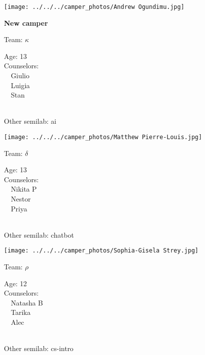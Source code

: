 \documentclass[10pt,letterpaper, landscape]{article}
\begin{document}
\horizontalshiftfornextsticker
\renewcommand{\baselinestretch}{1} \begin{sticker}
\noindent\begin{minipage}{0.5\textwidth}\texttt{[image: ../../../camper\_photos/Andrew Ogundimu.jpg]}\end{minipage}\begin{minipage}{0.45\textwidth}
\textbf{New camper} 

Team: {\Large $\kappa$}

Age:        13\\
Counselors: \\\ \ Giulio\\\ \ Luigia\\\ \ Stan\\
\end{minipage} \\ \vspace{0.07in}
Other semilab: ai
\end{sticker}
\verticalshiftfornextsticker
\renewcommand{\baselinestretch}{1} \begin{sticker}
\noindent\begin{minipage}{0.5\textwidth}\texttt{[image: ../../../camper\_photos/Matthew Pierre-Louis.jpg]}\end{minipage}\begin{minipage}{0.45\textwidth}
Team: {\Large $\delta$}

Age:        13\\
Counselors: \\\ \ Nikita P\\\ \ Nestor\\\ \ Priya\\
\end{minipage} \\ \vspace{0.07in}
Other semilab: chatbot
\end{sticker}
\horizontalshiftfornextsticker
\renewcommand{\baselinestretch}{1} \begin{sticker}
\noindent\begin{minipage}{0.5\textwidth}\texttt{[image: ../../../camper\_photos/Sophia-Gisela Strey.jpg]}\end{minipage}\begin{minipage}{0.45\textwidth}
Team: {\Large $\rho$}

Age:        12\\
Counselors: \\\ \ Natasha B\\\ \ Tarika\\\ \ Alec\\
\end{minipage} \\ \vspace{0.07in}
Other semilab: cs-intro
\end{sticker}
\end{document}
